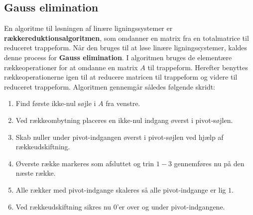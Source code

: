 \subsection{Gauss elimination}
En algoritme til løsningen af linære ligningssystemer er  \textbf{rækkereduktionsalgoritmen}, som omdanner en matrix fra en totalmatrice til reduceret trappeform.
Når den bruges til at løse linære ligningssystemer, kaldes denne process for \textbf{Gauss elimination}.
I algoritmen bruges de elementære rækkeoperationer for at omdanne en matrix $A$ til trappeform. 
Herefter benyttes rækkeoperationerne igen til at reducere matricen til trappeform og videre til reduceret trappeform.
Algoritmen gennemgår således følgende skridt:
%
\begin{enumerate}
\item Find første ikke-nul søjle i $A$ fra venstre.
\item Ved rækkeombytning placeres en ikke-nul indgang øverst i pivot-søjlen.
\item Skab nuller under pivot-indgangen øverst i pivot-søjlen ved hjælp af rækkeudskiftning.
\item Øverste række markeres som afsluttet og trin $1-3$ gennemføres nu på den næste række.
\item Alle rækker med pivot-indgange skaleres så alle pivot-indgange er lig $1$.
\item Ved rækkeudskiftning sikres nu $0$'er over og under pivot-indgangene.
\end{enumerate}
%
